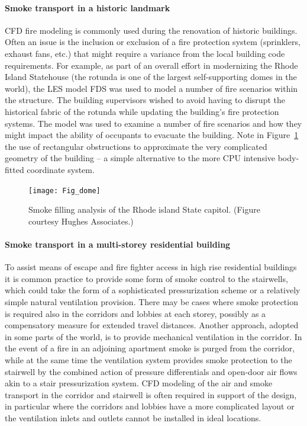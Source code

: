 \documentclass[graybox]{svmult}
\begin{document}
\paragraph{Smoke transport in a historic landmark}

CFD fire modeling is commonly used during the renovation of historic buildings. Often an issue is the inclusion or exclusion of a fire protection system (sprinklers, exhaust fans, etc.) that might require a variance from the local building code requirements. For example, as part of an overall effort in modernizing the Rhode Island Statehouse (the rotunda is one of the largest self-supporting domes in the world), the LES model FDS was used to model a number of fire scenarios within the structure. The building supervisors wished to avoid having to disrupt the historical fabric of the rotunda while updating the building's fire protection systems. The model was used to examine a number of fire scenarios and how they might impact the ability of occupants to evacuate the building. Note in Figure~\ref{Dome} the use of rectangular obstructions to approximate the very complicated geometry of the building -- a simple alternative to the more CPU intensive body-fitted coordinate system.

\begin{figure}[ht]
\texttt{[image: Fig\_dome]}
\caption{Smoke filling analysis of the Rhode island State capitol. (Figure courtesy Hughes Associates.)}
\label{Dome}
\end{figure}




\paragraph{Smoke transport in a multi-storey residential building}

To assist means of escape and fire fighter access in high rise residential buildings it is common practice to provide some form of smoke control to the stairwells, which could take the form of a sophisticated pressurization scheme or a relatively simple natural ventilation provision. There may be cases where smoke protection is required also in the corridors and lobbies at each storey, possibly as a compensatory measure for extended travel distances. Another approach, adopted in some parts of the world, is to provide mechanical ventilation in the corridor. In the event of a fire in an adjoining apartment smoke is purged from the corridor, while at the same time the ventilation system provides smoke protection to the stairwell by the combined action of pressure differentials and open-door air flows akin to a stair pressurization system. CFD modeling of the air and smoke transport in the corridor and stairwell is often required in support of the design, in particular where the corridors and lobbies have a more complicated layout or the ventilation inlets and outlets cannot be installed in ideal locations.
\end{document}
